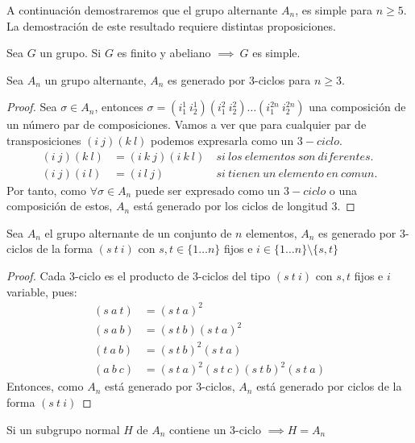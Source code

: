 A continuación demostraremos que el grupo alternante $A_n$, es simple para $n\geq 5$. La demostración de este resultado requiere distintas proposiciones.
\begin{pro}
	Sea $G$ un grupo. Si $G$ es finito y abeliano $\implies\ G$ es simple.
\end{pro}
\begin{pro}
	Sea $A_n$ un grupo alternante, $A_n$ es generado por 3-ciclos para $n\geq 3$.
\end{pro}
\begin{proof}
	Sea $\sigma \in A_n$, entonces $\sigma = (i_1^1\ i_2^1)(i_1^2\ i_2^2)\ldots(i_1^{2n}\ i_2^{2n})$ una composición de un número par de composiciones. Vamos a ver que para cualquier par de transposiciones $(i\ j)(k\ l)$ podemos expresarla como un $3-ciclo$.
	\begin{align*}
	(i\ j)(k\ l) &= (i\ k\ j)(i\ k\ l)\ &si\ los\ elementos\ son\ diferentes.\\
	(i\ j)(i\ l) &= (i\ l\ j)\ &si\ tienen\ un\ elemento\ en\ comun.
	\end{align*}
	Por tanto, como $\forall \sigma \in A_n$ puede ser expresado como un $3-ciclo$ o una composición de estos, $A_n$ está generado por los ciclos de longitud 3.
\end{proof}
\begin{pro}
	\label{pro:alternante3ciclos}
	Sea $A_n$ el grupo alternante de un conjunto de $n$ elementos, $A_n$ es generado por 3-ciclos de la forma $(s\ t\ i)$ con $s,t\in \{1\ldots n\}$ fijos e $i\in\{1\ldots n\}\setminus\{s,t\}$
\end{pro}
\begin{proof}
	Cada 3-ciclo es el producto de 3-ciclos del tipo $(s\ t\ i)$ con $s,t$ fijos e $i$ variable, pues:
	\begin{align*}
	(s\ a\ t) &= (s\ t\ a)^2\\
	(s\ a\ b) &= (s\ t\ b)(s\ t\ a)^2\\
	(t\ a\ b) &= (s\ t\ b)^2(s\ t\ a)\\
	(a\ b\ c) &= (s\ t\ a)^2(s\ t\ c)(s\ t\ b)^2(s\ t\ a)
	\end{align*}
	Entonces, como $A_n$ está generado por 3-ciclos, $A_n$ está generado por ciclos de la forma $(s\ t\ i)$
\end{proof}
\begin{thm}
	\label{thm:subequalsalternate}
	Si un subgrupo normal $H$ de $A_n$ contiene un 3-ciclo $\implies H = A_n$
\end{thm}
